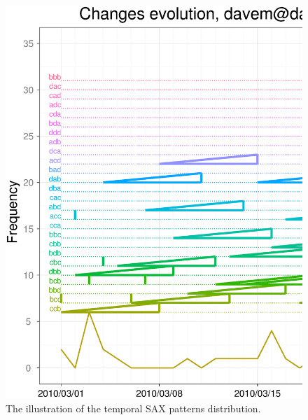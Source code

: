 \documentclass[a4paper,10pt]{article}
\numberwithin{equation}{subsection}
\begin{document}
\begin{figure}[h]
\noindent\begin{minipage}{\textwidth}
  \centering
  \includegraphics[width=\textwidth]{figures/march_fragment_w7p3a4.ps}
  \caption{The illustration of the temporal SAX patterns distribution.}
  \label{fig:march_patterns2}
\end{minipage}
\end{figure}
\end{document}
